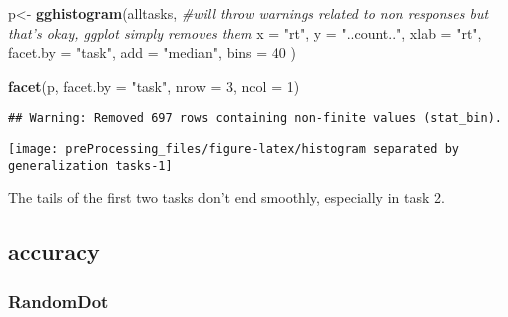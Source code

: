 \documentclass[
]{article}
\newenvironment{Shaded}{\begin{snugshade}}{\end{snugshade}}
\newcommand{\CommentTok}[1]{\textcolor[rgb]{0.56,0.35,0.01}{\textit{#1}}}
\newcommand{\DataTypeTok}[1]{\textcolor[rgb]{0.13,0.29,0.53}{#1}}
\newcommand{\DecValTok}[1]{\textcolor[rgb]{0.00,0.00,0.81}{#1}}
\newcommand{\KeywordTok}[1]{\textcolor[rgb]{0.13,0.29,0.53}{\textbf{#1}}}
\newcommand{\NormalTok}[1]{#1}
\newcommand{\StringTok}[1]{\textcolor[rgb]{0.31,0.60,0.02}{#1}}
\begin{document}
\begin{Shaded}
\begin{Highlighting}[]
\NormalTok{p<-}\StringTok{ }\KeywordTok{gghistogram}\NormalTok{(alltasks, }\CommentTok{#will throw warnings related to non responses but that's okay, ggplot simply removes them}
       \DataTypeTok{x =} \StringTok{"rt"}\NormalTok{,}
       \DataTypeTok{y =} \StringTok{"..count.."}\NormalTok{,}
       \DataTypeTok{xlab =} \StringTok{"rt"}\NormalTok{,}
       \DataTypeTok{facet.by =} \StringTok{"task"}\NormalTok{,}
       \DataTypeTok{add =} \StringTok{"median"}\NormalTok{,}
       \DataTypeTok{bins =} \DecValTok{40}
\NormalTok{)}

\KeywordTok{facet}\NormalTok{(p, }\DataTypeTok{facet.by =} \StringTok{"task"}\NormalTok{,}
      \DataTypeTok{nrow =} \DecValTok{3}\NormalTok{,}
      \DataTypeTok{ncol =} \DecValTok{1}\NormalTok{)}
\end{Highlighting}
\end{Shaded}

\begin{verbatim}
## Warning: Removed 697 rows containing non-finite values (stat_bin).
\end{verbatim}

\begin{center}\texttt{[image: preProcessing\_files/figure-latex/histogram separated by generalization tasks-1]} \end{center}

The tails of the first two tasks don't end smoothly, especially in task
2.

\hypertarget{accuracy}{%
\subsection{accuracy}\label{accuracy}}

\hypertarget{randomdot}{%
\subsubsection{RandomDot}\label{randomdot}}
\end{document}
